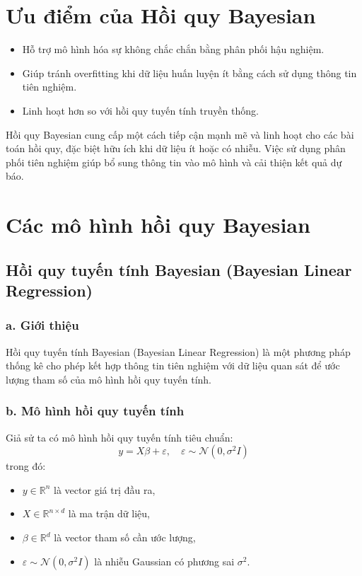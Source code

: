 \section{Ưu điểm của Hồi quy Bayesian}
\begin{itemize}
    \item Hỗ trợ mô hình hóa sự không chắc chắn bằng phân phối hậu nghiệm.
    \item Giúp tránh overfitting khi dữ liệu huấn luyện ít bằng cách sử dụng thông tin tiên nghiệm.
    \item Linh hoạt hơn so với hồi quy tuyến tính truyền thống.
\end{itemize}

Hồi quy Bayesian cung cấp một cách tiếp cận mạnh mẽ và linh hoạt cho các bài toán hồi quy, đặc biệt hữu ích khi dữ liệu ít hoặc có nhiễu. Việc sử dụng phân phối tiên nghiệm giúp bổ sung thông tin vào mô hình và cải thiện kết quả dự báo.

\section{Các mô hình hồi quy Bayesian}
\subsection{Hồi quy tuyến tính Bayesian (Bayesian Linear Regression)}
\subsubsection{a. Giới thiệu}
Hồi quy tuyến tính Bayesian (Bayesian Linear Regression) là một phương pháp thống kê cho phép kết hợp thông tin tiên nghiệm với dữ liệu quan sát để ước lượng tham số của mô hình hồi quy tuyến tính.

\subsubsection{b. Mô hình hồi quy tuyến tính}
Giả sử ta có mô hình hồi quy tuyến tính tiêu chuẩn:
\begin{equation}
    y = X \beta + \varepsilon, \quad \varepsilon \sim \mathcal{N}(0, \sigma^2 I)
\end{equation}
trong đó:
\begin{itemize}
    \item $y \in \mathbb{R}^n$ là vector giá trị đầu ra,
    \item $X \in \mathbb{R}^{n \times d}$ là ma trận dữ liệu,
    \item $\beta \in \mathbb{R}^d$ là vector tham số cần ước lượng,
    \item $\varepsilon \sim \mathcal{N}(0, \sigma^2 I)$ là nhiễu Gaussian có phương sai $\sigma^2$.
\end{itemize}

